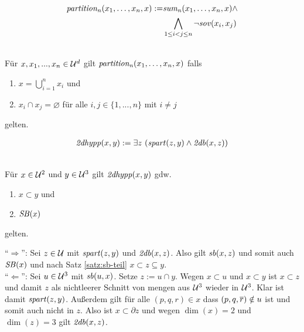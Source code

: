 \begin{erin}
    \begin{align*}
        \mathit{partition_{n}}(x_{1},\ldots,x_{n},x) := &\mathit{sum_{n}}(x_{1},\ldots,x_{n},x) \wedge\\ &\bigwedge_{1 \leq i < j \leq n} \neg\mathit{sov}(x_i,x_j)
    \end{align*}
\end{erin}

\begin{hyp}\ \\
    Für $x, x_1, ..., x_n \in \mathcal{U}^d$ gilt $\mathit{partition_{n}}(x_{1},\ldots,x_{n},x)$ falls
    \begin{enumerate}
        \item $ x = \bigcup_{i=1}^{n} x_i$ und
        \item $x_i \cap x_j = \varnothing$ für alle $i,j \in \{1, ..., n\}$ mit $ i \neq j$
    \end{enumerate}
    gelten.
\end{hyp}



\begin{erin}
    \begin{align*}
        \mathit{2dhypp}(x,y) := \exists z\ (\mathit{spart}(z,y) \wedge \mathit{2db}(x,z))
    \end{align*}
\end{erin}

\begin{satz}\ \\
    Für $x \in \mathcal{U}^2$ und $y \in \mathcal{U}^3$ gilt $\mathit{2dhypp}(x,y)$ gdw. 
    \begin{enumerate}
        \item $x \subset y$ und
        \item $\mathit{S\hspace*{-0.25ex}B}(x)$
    \end{enumerate}
    gelten.
\end{satz}

\begin{bew}
    ``$\Rightarrow$'': Sei $z \in \mathcal{U}$ mit $\mathit{spart}(z,y)$ und $\mathit{2db}(x,z)$.
    Also gilt $\mathit{sb}(x,z)$ und somit auch $\mathit{S\hspace*{-0.25ex}B}(x)$ und nach Satz \ref{satz:sb-teil} $x \subset z \subseteq y$.
    \\
    ``$\Leftarrow$'': Sei $u \in \mathcal{U}^3$ mit $\mathit{sb}(u,x)$. 
    Setze $z := u \cap y$.
    Wegen $x \subset u$ und $x \subset y$ ist $x \subset z$ und damit $z$ als nichtleerer Schnitt von mengen aus $\mathcal{U}^3$ wieder in $\mathcal{U}^3$.
    Klar ist damit $\mathit{spart}(z,y)$.
    Außerdem gilt für alle $(p,q,r) \in x$ dass $(p,q,\overline{r}) \notin u$ ist und somit auch nicht in $z$. 
    Also ist $x \subset \partial z$ und wegen $\dim(x) = 2$ und $\dim(z) = 3$ gilt $\mathit{2db}(x,z)$.
\end{bew}


